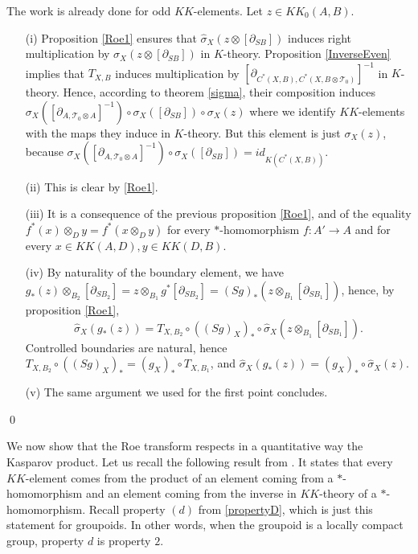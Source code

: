\begin{dem} The work is already done for odd $KK$-elements. Let $z\in KK_0(A,B)$.
\begin{enumerate}
\item[(i)] Proposition \ref{Roe1} ensures that $\hat \sigma_X(z\otimes [\partial_{SB}])$ induces right multiplication by $\sigma_X(z\otimes [\partial_{SB}])$ in $K$-theory. Proposition \ref{InverseEven} implies that $T_{X,B}$ induces multiplication by $[\partial_{C^*(X,B),C^*(X,B\otimes\mathcal T_0)}]^{-1}$ in $K$-theory. Hence, according to theorem \ref{sigma}, their composition induces $ \sigma_X([\partial_{A,\mathcal T_0 \otimes  A}]^{-1})\circ\sigma_X([\partial_{SB}])\circ\sigma_X(z)$ where we identify $KK$-elements with the maps they induce in $K$-theory. But this element is just $\sigma_X(z)$, because  $\sigma_X([\partial_{A,\mathcal T_0 \otimes  A}]^{-1})\circ\sigma_X([\partial_{SB}])= id_{K(C^*(X,B))}$.
\item[(ii)] This is clear by \ref{Roe1}.
\item[(iii)] It is a consequence of the previous proposition \ref{Roe1}, and of the equality $f^*(x)\otimes_D y = f^*(x\otimes_D y)$ for every $*$-homomorphism $f : A'\rightarrow A$ and for every $x\in KK(A,D),y\in KK(D,B)$.
\item[(iv)] By naturality of the boundary element, we have $g_*(z)\otimes_{B_2} [\partial_{SB_2}] = z\otimes_{B_1} g^{*}[\partial _{SB_2}] = (Sg)_{*}(z\otimes_{B_1} [\partial _{SB_1}])$, hence, by proposition \ref{Roe1}, 
\[\hat\sigma_X(g_*(z)) = T_{X,B_2}\circ ((Sg)_X)_* \circ \hat\sigma_{X}(z\otimes_{B_1} [\partial_{SB_1}]).\]
Controlled boundaries are natural, hence $T_{X,B_2}\circ ((Sg)_X)_* = (g_X)_* \circ T_{X,B_1}$, and $\hat\sigma_X(g_*(z)) =(g_X)_* \circ \hat\sigma_X(z)$.
\item[(v)] The same argument we used for the first point concludes.
\end{enumerate}
\qed
\end{dem}

We now show that the Roe transform respects in a quantitative way the Kasparov product. Let us recall the following result from \cite{lafforgue2002k}. It states that every $KK$-element comes from the product of an element coming from a $*$-homomorphism and an element coming from the inverse in $KK$-theory of a $*$-homomorphism. Recall property $(d)$ from \ref{propertyD}, which is just this statement for groupoids. In other words, when the groupoid is a locally compact group, property $d$ is property $2$.

